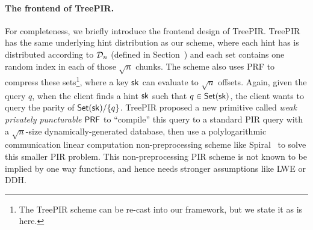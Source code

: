 \paragraph{The frontend of TreePIR.}
For completeness, we briefly introduce the frontend design of TreePIR.
TreePIR has the same underlying hint distribution as our scheme, where each hint has is distributed according to $\mathcal{D}_n$ (defined in Section~) and each set contains one random index in each of those $\sqrt{n}$ chunks.
The scheme also uses PRF to compress these sets\footnote{The TreePIR scheme can be re-cast into our \ppps framework, but we state it as is here.}, where a key $\mathsf{sk}$ can evaluate to $\sqrt{n}$ offsets.
Again, given the query $q$, when the client finds a hint $\mathsf{sk}$ such that $q
\in \mathsf{Set}(\mathsf{sk})$, the client wants to query the parity of $\mathsf{Set}(\mathsf{sk})/\{q\}$.
TreePIR proposed a new primitive called \emph{weak privately puncturable} $\mathsf{PRF}$ to ``compile'' this query to a standard PIR query with a $\sqrt{n}$-size dynamically-generated database, then use a polylogarithmic communication linear computation non-preprocessing scheme like Spiral~\cite{spiral} to solve this smaller PIR problem. 
This non-preprocessing PIR scheme is not known to be implied by one way functions, and hence needs stronger assumptions like LWE or DDH.






